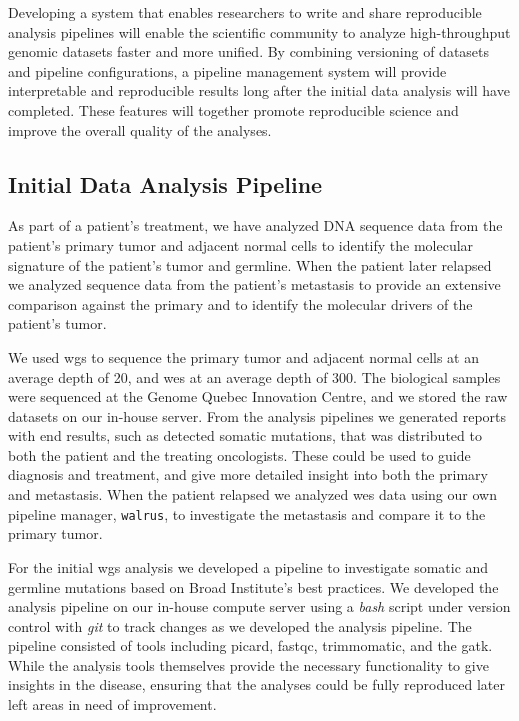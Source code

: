 Developing a system that enables researchers to write and share reproducible
analysis pipelines will enable the scientific community to analyze
high-throughput genomic datasets faster and more unified. By combining
versioning of datasets and pipeline configurations, a pipeline management system
will provide interpretable and reproducible results long after the initial data
analysis will have completed. These features will together promote reproducible
science and improve the overall quality of the analyses. 

\subsection{Initial Data Analysis Pipeline} 
As part of a patient's treatment, we have analyzed DNA sequence data from the
patient's primary tumor and adjacent normal cells to identify the molecular
signature of the patient's tumor and germline. When the patient later relapsed
we analyzed sequence data from the patient's metastasis to provide an extensive
comparison against the primary and to identify the molecular drivers of the
patient's tumor. 

We used \gls{wgs} to sequence the primary tumor and adjacent normal cells at an
average depth of 20, and \gls{wes} at an average depth of 300. The biological
samples were sequenced at the Genome Quebec Innovation Centre, and we stored the
raw datasets on our in-house server.  From the analysis pipelines we generated
reports with end results, such as detected somatic mutations, that was
distributed to both the patient and the treating oncologists. These could be
used to guide diagnosis and treatment, and give more detailed insight into both
the primary and metastasis.  When the patient relapsed we analyzed \gls{wes}
data using our own pipeline manager, \texttt{walrus}, to investigate the
metastasis and compare it to the primary tumor. 

For the initial \gls{wgs} analysis we developed a pipeline to investigate
somatic and germline mutations based on Broad Institute's best practices. We
developed the analysis pipeline on our in-house compute server using a
\emph{bash} script under version control with \emph{git} to track changes as we
developed the analysis pipeline. The pipeline consisted of tools including
picard\cite{picard}, fastqc\cite{fastqc}, trimmomatic\cite{trimmomatic}, and the
\gls{gatk}.\cite{gatk} While the analysis tools themselves provide the necessary
functionality to give insights in the disease, 
ensuring that the analyses could be fully reproduced later left areas in need of
improvement.

